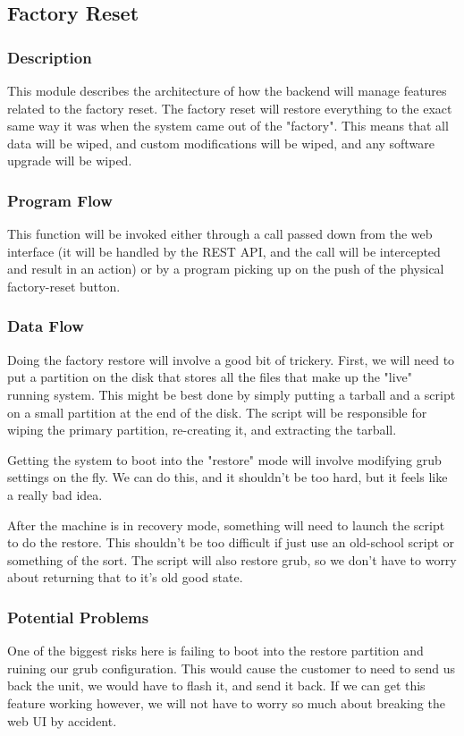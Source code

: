 
\subsection{Factory Reset}

\subsubsection{Description}

This module describes the architecture of how the backend will manage features related to the factory reset.
The factory reset will restore everything to the exact same way it was when the system came out of the "factory".
This means that all data will be wiped, and custom modifications will be wiped, and any software upgrade will be wiped.

\subsubsection{Program Flow}

This function will be invoked either through a call passed down from the web interface (it will be handled by the \ac{REST} \ac{API}, and the call will be intercepted and result in an action) or by a program picking up on the push of the physical factory-reset button.

\subsubsection{Data Flow}

Doing the factory restore will involve a good bit of trickery. 
First, we will need to put a partition on the disk that stores all the files that make up the "live" running system. 
This might be best done by simply putting a tarball and a script on a small partition at the end of the disk. 
The script will be responsible for wiping the primary partition, re-creating it, and extracting the tarball.

Getting the system to boot into the "restore" mode will involve modifying grub settings on the fly. 
We can do this, and it shouldn't be too hard, but it feels like a really bad idea.

After the machine is in recovery mode, something will need to launch the script to do the restore.
This shouldn't be too difficult if just use an old-school  script or something of the sort.
The script will also restore grub, so we don't have to worry about returning that to it's old good state.

\subsubsection{Potential Problems}

One of the biggest risks here is failing to boot into the restore partition and ruining our grub configuration.
This would cause the customer to need to send us back the unit, we would have to flash it, and send it back.
If we can get this feature working however, we will not have to worry so much about breaking the web UI by accident.
